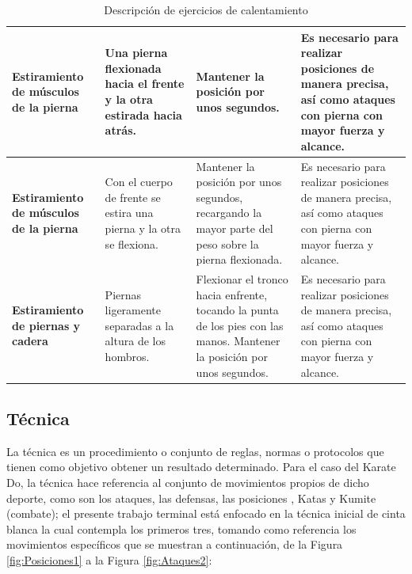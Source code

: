 \begin{table}[H]
\centering
\begin{tabular}{| p{3 cm} | p{4 cm} | p{4 cm} | p{4 cm} |}
\hline
\textbf{Estiramiento de músculos de la pierna} & Una pierna flexionada hacia el frente y la otra estirada hacia atrás. & Mantener la posición por unos segundos. & Es necesario para realizar posiciones de manera precisa, así como ataques con pierna con mayor fuerza y alcance.\\
\hline	
\textbf{Estiramiento de músculos de la pierna} & Con el cuerpo de frente se estira una pierna y la otra se flexiona. & Mantener la posición por unos segundos, recargando la mayor parte del peso sobre la pierna flexionada. & Es necesario para realizar posiciones de manera precisa, así como ataques con pierna con mayor fuerza y alcance.\\
\hline
\textbf{Estiramiento de piernas y cadera} & Piernas ligeramente separadas a la altura de los hombros. & Flexionar el tronco hacia enfrente, tocando la punta de los pies con las manos.
Mantener la posición por unos segundos. & Es necesario para realizar posiciones de manera precisa, así como ataques con pierna con mayor fuerza y alcance.\\
\hline
\end{tabular}
\caption{Descripción de ejercicios de calentamiento}
\label{tab:DEC2}
\end{table} 

\subsection{Técnica}
La técnica es un procedimiento o conjunto de reglas, normas o protocolos que tienen como objetivo obtener un resultado determinado.
Para el caso del Karate Do, la técnica hace referencia al conjunto de movimientos propios de dicho deporte, como son los ataques, las defensas, las posiciones , Katas y Kumite (combate); el presente trabajo terminal está enfocado en la técnica inicial de cinta blanca la cual contempla los primeros tres, tomando como referencia los movimientos específicos que se muestran a continuación, de la Figura \ref{fig:Posiciones1} a la Figura \ref{fig:Ataques2}:

